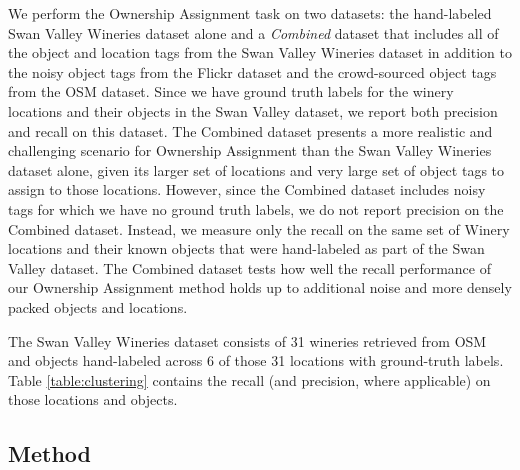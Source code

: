 We perform the Ownership Assignment task on two datasets: the hand-labeled Swan Valley Wineries dataset alone and a \textit{Combined} dataset that includes all of the object and location tags from the Swan Valley Wineries dataset in addition to the noisy object tags from the Flickr dataset and the crowd-sourced object tags from the OSM dataset.
Since we have ground truth labels for the winery locations and their objects in the Swan Valley dataset, we report both precision and recall on this dataset.
The Combined dataset presents a more realistic and challenging scenario for Ownership Assignment than the Swan Valley Wineries dataset alone, given its larger set of locations and very large set of object tags to assign to those locations. However, since the Combined dataset includes noisy tags for which we have no ground truth labels, we do not report precision on the Combined dataset. Instead, we measure only the recall on the same set of Winery locations and their known objects that were hand-labeled as part of the Swan Valley dataset. The Combined dataset tests how well the recall performance of our Ownership Assignment method holds up to additional noise and more densely packed objects and locations.

The Swan Valley Wineries dataset consists of 31 wineries retrieved from OSM and  objects hand-labeled across 6 of those 31 locations with ground-truth labels. Table \ref{table:clustering} contains the recall (and precision, where applicable) on those locations and objects.


\subsection{Method}


